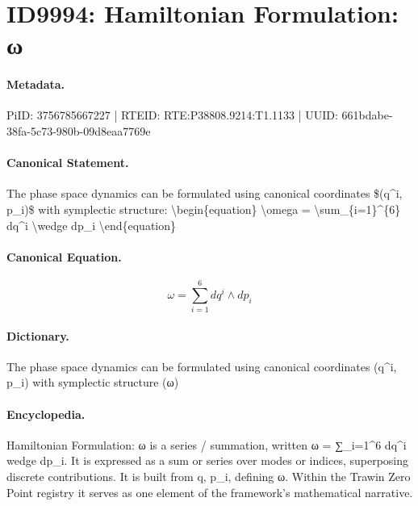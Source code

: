 \section*{ID9994: Hamiltonian Formulation: ω}
\paragraph{Metadata.}
PiID: 3756785667227 | RTEID: RTE:P38808.9214:T1.1133 | UUID: 661bdabe-38fa-5c73-980b-09d8eaa7769e

\paragraph{Canonical Statement.}
The phase space dynamics can be formulated using canonical coordinates \$(q\textasciicircum{}i, p\_i)\$ with symplectic structure: \textbackslash{}begin\{equation\} \textbackslash{}omega = \textbackslash{}sum\_\{i=1\}\textasciicircum{}\{6\} dq\textasciicircum{}i \textbackslash{}wedge dp\_i \textbackslash{}end\{equation\}

\paragraph{Canonical Equation.}
\[
\omega = \sum_{i=1}^{6} dq^i \wedge dp_i
\]

\paragraph{Dictionary.}
The phase space dynamics can be formulated using canonical coordinates (q\textasciicircum{}i, p\_i) with symplectic structure (ω)

\paragraph{Encyclopedia.}
Hamiltonian Formulation: ω is a series / summation, written ω = ∑\_i=1\textasciicircum{}6 dq\textasciicircum{}i wedge dp\_i. It is expressed as a sum or series over modes or indices, superposing discrete contributions. It is built from q, p\_i, defining ω. Within the Trawin Zero Point registry it serves as one element of the framework's mathematical narrative.
